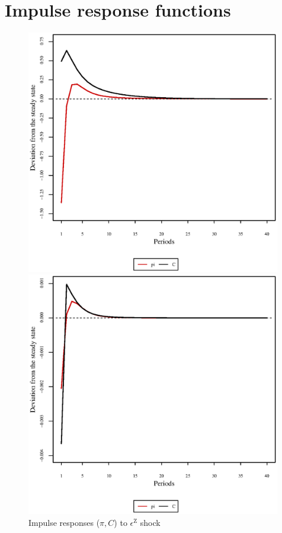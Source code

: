\pagebreak

\section{Impulse response functions}

\begin{figure}[h]
\begin{minipage}{0.5\textwidth}
\vspace*{-3em}
\centering
\includegraphics[width=0.99\textwidth, scale=0.55]{plots/plot_26.eps}
\caption{Impulse responses ($\pi, C$) to $\epsilon^{\mathrm{Z}}$ shock}
\end{minipage}
\begin{minipage}{0.5\textwidth}
\vspace*{-3em}
\centering
\includegraphics[width=0.99\textwidth, scale=0.55]{plots/plot_27.eps}

\end{minipage}
\end{figure}
